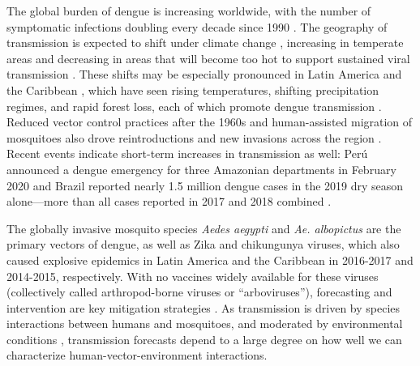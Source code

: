 The global burden of dengue is increasing worldwide, with the number of symptomatic infections doubling every decade since 1990 \cite{Stanaway2016-mo}. The geography of transmission is expected to shift under climate change \cite{Bhatt2013-qa, Campbell2015-ky}, increasing in temperate areas and decreasing in areas that will become too hot to support sustained viral transmission \cite{Mordecai2019-ya, Ryan2019-pz}. These shifts may be especially pronounced in Latin America and the Caribbean \cite{Shepard2011-nz, Tapia-Conyer2012-yw}, which have seen rising temperatures, shifting precipitation regimes, and rapid forest loss, each of which promote dengue transmission \cite{Locatelli2011-de, Marengo2011-jk, Collins2013-zo, Nobre2016-jn}. Reduced vector control practices after the 1960s \cite{Gubler2002-af, Gomez-Dantes2009-iu} and human-assisted migration of mosquitoes also drove reintroductions and new invasions across the region \cite{Knudsen1995-pc, Rossi1999-sr, Tatem2006-qu, Ortega-Morales2016-jd}. Recent events indicate short-term increases in transmission as well: Perú announced a dengue emergency for three Amazonian departments in February 2020 \cite{Ministerio_de_Salud_Peru2020-pb, US_Embassy_Lima2020-gd} and Brazil reported nearly 1.5 million dengue cases in the 2019 dry season alone—more than all cases reported in 2017 and 2018 combined \cite{Brazil2019-xb, Pan_American_Health_Organization_World_Health_Organization2020-ov}.

The globally invasive mosquito species \textit{Aedes aegypti} and \textit{Ae. albopictus} are the primary vectors of dengue, as well as Zika and chikungunya viruses, which also caused explosive epidemics in Latin America and the Caribbean in 2016-2017 and 2014-2015, respectively. With no vaccines widely available for these viruses (collectively called arthropod-borne viruses or “arboviruses”), forecasting and intervention are key mitigation strategies \cite{Tapia-Conyer2012-yw, Altizer2013-dn, Castro2019-jb}. As transmission is driven by species interactions between humans and mosquitoes, and moderated by environmental conditions \cite{Hopp2001-zf, Paaijmans2013-dg, Mordecai2019-ya}, transmission forecasts depend to a large degree on how well we can characterize human-vector-environment interactions.

